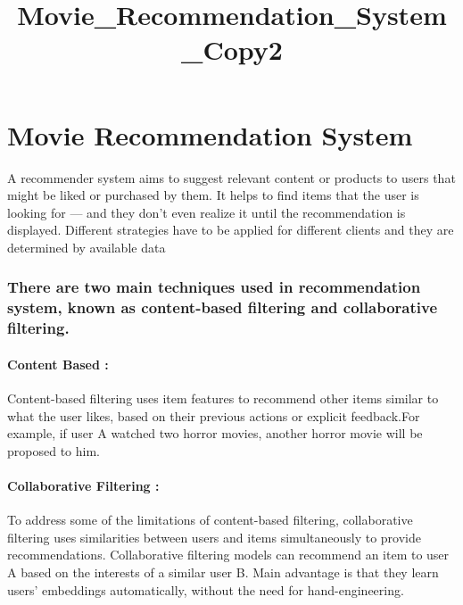 \documentclass[11pt]{article}
\title{Movie\_Recommendation\_System\_Copy2}
\begin{document}
    
    \maketitle
    
    

    
    \hypertarget{movie-recommendation-system}{%
\section{Movie Recommendation
System}\label{movie-recommendation-system}}

    A recommender system aims to suggest relevant content or products to
users that might be liked or purchased by them. It helps to find items
that the user is looking for --- and they don't even realize it until
the recommendation is displayed. Different strategies have to be applied
for different clients and they are determined by available data

    \hypertarget{there-are-two-main-techniques-used-in-recommendation-system-known-as-content-based-filtering-and-collaborative-filtering.}{%
\subsubsection{There are two main techniques used in recommendation
system, known as content-based filtering and collaborative
filtering.}\label{there-are-two-main-techniques-used-in-recommendation-system-known-as-content-based-filtering-and-collaborative-filtering.}}

    \hypertarget{content-based}{%
\paragraph{Content Based :}\label{content-based}}

    Content-based filtering uses item features to recommend other items
similar to what the user likes, based on their previous actions or
explicit feedback.For example, if user A watched two horror movies,
another horror movie will be proposed to him.

    \hypertarget{collaborative-filtering}{%
\paragraph{Collaborative Filtering :}\label{collaborative-filtering}}

    To address some of the limitations of content-based filtering,
collaborative filtering uses similarities between users and items
simultaneously to provide recommendations. Collaborative filtering
models can recommend an item to user A based on the interests of a
similar user B. Main advantage is that they learn users' embeddings
automatically, without the need for hand-engineering.
\end{document}
